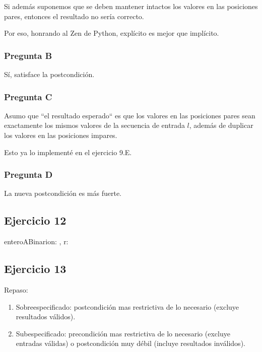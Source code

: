 Si además suponemos que se deben mantener intactos los valores en las posiciones pares, entonces el resultado no sería correcto.

Por eso, honrando al Zen de Python, explícito es mejor que implícito.

\subsubsection{Pregunta B}

Sí, satisface la postcondición.

\subsubsection{Pregunta C}

Asumo que ``el resultado esperado`` es que los valores en las posiciones pares sean exactamente los mismos valores de la secuencia de entrada $l$, además de duplicar los valores en las posiciones impares.

Esto ya lo implementé en el ejercicio 9.E.

\subsubsection{Pregunta D}

La nueva postcondición es más fuerte.

\subsection{Ejercicio 12}

\begin{proc}{enteroABinario}{\In n: \ent, \Out r: \TLista{\ent}}{}
\end{proc}

\subsection{Ejercicio 13}

Repaso:

\begin{enumerate}[1)]
    \item Sobreespecificado: postcondición mas restrictiva de lo necesario (excluye resultados válidos).
    \item Subespecificado: precondición mas restrictiva de lo necesario (excluye entradas válidas) o postcondición muy débil (incluye resultados inválidos).
\end{enumerate}

